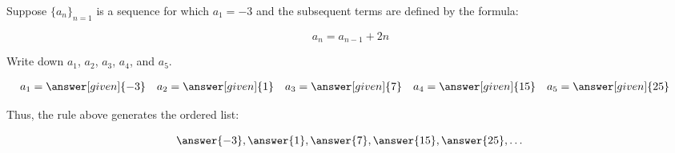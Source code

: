 \documentclass{ximera}
\author{Jim Talamo}
\begin{document}
\begin{exercise}

Suppose $\{a_n\}_{n=1}$ is a sequence for which $a_1=-3$ and the subsequent terms are defined by the formula:

\[a_n = a_{n-1}+2n \]

Write down $a_1$, $a_2$, $a_3$, $a_4$, and $a_5$.

    \begin{align*}
      a_1 &= \answer[given]{-3} & 
      a_2 &= \answer[given]{1} & 
      a_3 &= \answer[given]{7} & 
      a_4 &= \answer[given]{15} & 
      a_5 &= \answer[given]{25} 
    \end{align*}

\begin{exercise}    
Thus, the rule above generates the ordered list:

\[
\answer{-3} ,\answer{1},\answer{7},\answer{15},\answer{25}, \dots
\]   



\end{exercise}
\end{exercise}
\end{document}
